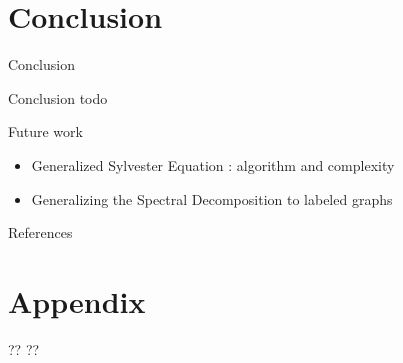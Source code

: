 \documentclass[compress]{beamer}
\begin{document}
\section{Conclusion}
\begin{frame}[plain]{Conclusion}
\begin{block}{Conclusion}
	todo
\end{block}
\begin{block}{Future work}
	\begin{itemize}
		\item Generalized Sylvester Equation : algorithm and complexity
		\item Generalizing the Spectral Decomposition to labeled graphs
	\end{itemize}
\end{block}
\end{frame}

\renewcommand\bibsection{\subsection{\refname}}
\begin{frame}[plain]{References}
\nocite{bondy1976graph,borgwardt_protein_2005,imrich2000product,burges_tutorial_1998,vapnik_statistical_1998,nesterov_lectures_2018,shervashidze_efficient_2009}

\footnotesize

\end{frame}

\appendix
\section[]{Appendix}
\begin{frame}[plain]{??}
??
\end{frame}
\end{document}
